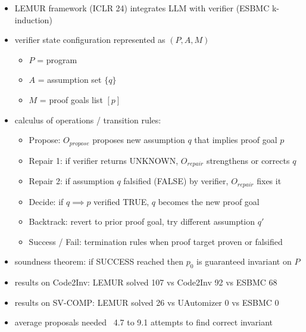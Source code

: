 \documentclass[11pt]{book}
\begin{document}
\begin{itemize}
```
\item LEMUR framework (ICLR 24) integrates LLM with verifier (ESBMC k-induction)
\item verifier state configuration represented as $(P, A, M)$
\begin{itemize}
    \item $P$ = program
    \item $A$ = assumption set $\{q\}$
    \item $M$ = proof goals list $[p]$
\end{itemize}
\item calculus of operations / transition rules:
\begin{itemize}
    \item Propose: $O_{propose}$ proposes new assumption $q$ that implies proof goal $p$
    \item Repair 1: if verifier returns UNKNOWN, $O_{repair}$ strengthens or corrects $q$
    \item Repair 2: if assumption $q$ falsified (FALSE) by verifier, $O_{repair}$ fixes it
    \item Decide: if $q \implies p$ verified TRUE, $q$ becomes the new proof goal
    \item Backtrack: revert to prior proof goal, try different assumption $q'$
    \item Success / Fail: termination rules when proof target proven or falsified
\end{itemize}
\item soundness theorem: if SUCCESS reached then $p_0$ is guaranteed invariant on $P$
\item results on Code2Inv: LEMUR solved 107 vs Code2Inv 92 vs ESBMC 68
\item results on SV-COMP: LEMUR solved 26 vs UAutomizer 0 vs ESBMC 0
\item average proposals needed ~4.7 to 9.1 attempts to find correct invariant



\end{itemize}
\end{document}
